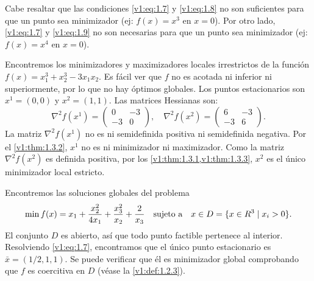 Cabe resaltar que las condiciones \eqref{v1:eq:1.7} y \eqref{v1:eq:1.8} no son suficientes para que un punto sea minimizador (ej: $f(x)=x^3$ en $x=0$). Por otro lado, \eqref{v1:eq:1.7} y \eqref{v1:eq:1.9} no son necesarias para que un punto sea minimizador (ej: $f(x)=x^4$ en $x=0$). 

\begin{example}\label{v1:exa:1.3.1}
 Encontremos los minimizadores y maximizadores locales irrestrictos de la función $f(x) = x_1^3 + x_2^3 - 3x_1x_2$. Es fácil ver que $f$ no es acotada ni inferior ni superiormente, por lo que no hay óptimos globales. Los puntos estacionarios son $x^1 = (0,0)$ y $x^2 = (1,1)$. Las matrices Hessianas son:
 \[
 \nabla^2 f(x^1) = \begin{pmatrix} 0 & -3 \\ -3 & 0 \end{pmatrix}, \quad
 \nabla^2 f(x^2) = \begin{pmatrix} 6 & -3 \\ -3 & 6 \end{pmatrix}.
 \]
 La matriz $\nabla^2 f(x^1)$ no es ni semidefinida positiva ni semidefinida negativa. Por el \cref{v1:thm:1.3.2}, $x^1$ no es ni minimizador ni maximizador. Como la matriz $\nabla^2 f(x^2)$ es definida positiva, por los \cref{v1:thm:1.3.1,v1:thm:1.3.3}, $x^2$ es el único minimizador local estricto.
\end{example}

\begin{example}\label{v1:exa:1.3.2}
 Encontremos las soluciones globales del problema
 \[
 \min f(x) = x_1 + \frac{x_2^2}{4x_1} + \frac{x_3^2}{x_2} + \frac{2}{x_3} \quad \text{sujeto a} \quad x \in D = \{x \in R^3 \mid x_i > 0\}.
 \]
 El conjunto $D$ es abierto, así que todo punto factible pertenece al interior. Resolviendo \eqref{v1:eq:1.7}, encontramos que el único punto estacionario es $\bar{x} = (1/2, 1, 1)$. Se puede verificar que él es minimizador global comprobando que $f$ es coercitiva en $D$ (véase la \cref{v1:def:1.2.3}).
\end{example}